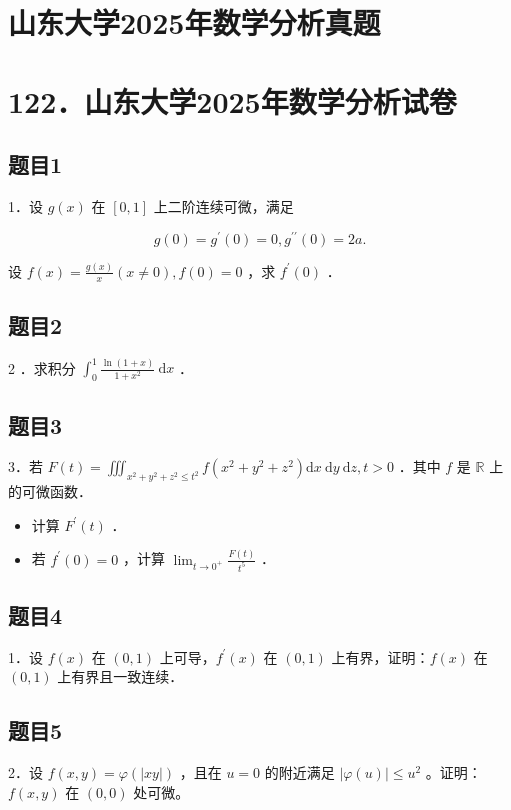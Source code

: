 \documentclass{article}
\begin{document}
\section*{山东大学2025年数学分析真题}
\section*{122．山东大学2025年数学分析试卷}

\subsection{题目1}
1．设 \(g(x)\) 在 \([0,1]\) 上二阶连续可微，满足

\[
g(0)=g^{\prime}(0)=0, g^{\prime \prime}(0)=2 a .
\]

设 \(f(x)=\frac{g(x)}{x}(x \neq 0), f(0)=0\) ，求 \(f^{\prime}(0)\) ．

\subsection{题目2}
2 ．求积分 \(\int_{0}^{1} \frac{\ln (1+x)}{1+x^{2}} \mathrm{~d} x\) ．

\subsection{题目3}
3．若 \(F(t)=\iiint_{x^{2}+y^{2}+z^{2} \leq t^{2}} f\left(x^{2}+y^{2}+z^{2}\right) \mathrm{d} x \mathrm{~d} y \mathrm{~d} z, t>0\) ．其中 \(f\) 是 \(\mathbb{R}\) 上的可微函数．

\begin{itemize}
  \item[（i）] 计算 \(F^{\prime}(t)\) ．
  \item[（ii）] 若 \(f^{\prime}(0)=0\) ，计算 \(\lim _{t \rightarrow 0^{+}} \frac{F(t)}{t^{5}}\) ．
\end{itemize}

\subsection{题目4}
1．设 \(f(x)\) 在 \((0,1)\) 上可导，\(f^{\prime}(x)\) 在 \((0,1)\) 上有界，证明：\(f(x)\) 在 \((0,1)\) 上有界且一致连续．

\subsection{题目5}
2．设 \(f(x, y)=\varphi(|x y|)\) ，且在 \(u=0\) 的附近满足 \(|\varphi(u)| \leq u^{2}\) 。证明：\(f(x, y)\) 在 \((0,0)\) 处可微。
\end{document}
